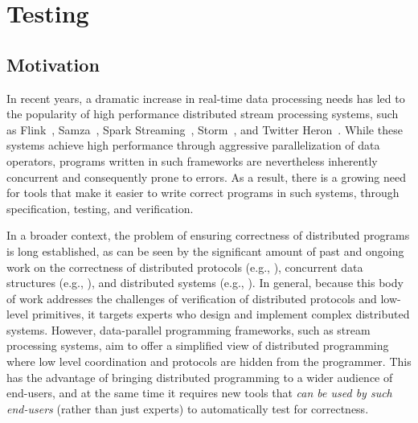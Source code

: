 \chapter{Testing}
\label{cha:testing}

\section{Motivation}
\label{diffstream:sec:introduction}

In recent years, a dramatic increase in real-time data processing needs
has led to the popularity of high performance distributed stream processing systems, such as Flink~\cite{Flink2015}, Samza~\cite{Samza2017}, Spark Streaming~\cite{Spark2013}, Storm~\cite{Storm}, and Twitter Heron~\cite{kulkarni2015twitter-heron}.
While these systems achieve high performance through aggressive parallelization of data operators, programs written in such frameworks are nevertheless inherently concurrent and consequently prone to errors.
As a result, there is a growing need for tools that make it easier to write correct programs in such systems, through specification, testing, and verification.

In a broader context, the problem of ensuring correctness of distributed programs is long established, as can be seen by the significant amount of past and ongoing work on the correctness of distributed protocols (e.g., \cite{chand2016formal,abdulla2014optimal,padon2016ivy}), concurrent data structures (e.g., \cite{herlihy1990linearizability,burckhardt2014replicated}),
and distributed systems (e.g., \cite{ozkan2018randomized,wilcox2015verdi,hawblitzel2015ironfleet}).
In general, because this body of work addresses the challenges of verification of distributed protocols and low-level primitives, it targets experts who design and implement complex distributed systems.
However, data-parallel programming frameworks, such as stream processing systems, aim to offer a simplified view of distributed programming where low level coordination and protocols are hidden from the programmer. This has the advantage of bringing distributed programming to a wider audience of end-users, and at the same time it requires new tools that \emph{can be used by such end-users} (rather than just experts) to automatically test for correctness.

